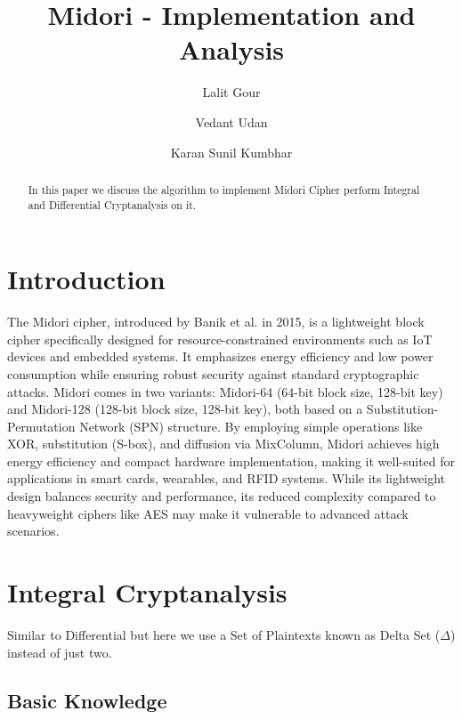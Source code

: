 \documentclass[journal=tosc,preprint]{iacrtrans}
\author{Lalit Gour\inst{1,2} \and Vedant Udan\inst{1,3} \and Karan Sunil Kumbhar\inst{1,4}}
\institute{
  \iitbhilai \and \email{lalitg@iitbhilai.ac.in} \and
  \email{udanvedant@iitbhilai.ac.in} \and
  \email{karansunilk@iitbhilai.ac.in} 
}
\title{Midori - Implementation and Analysis}
\begin{document}
\maketitle




\begin{abstract}
    In this paper we discuss the algorithm to implement Midori Cipher perform Integral and Differential Cryptanalysis on it.

\end{abstract}


\section{Introduction}

The Midori cipher, introduced by Banik et al. in 2015, is a lightweight block cipher specifically designed for resource-constrained environments such as IoT devices and embedded systems. It emphasizes energy efficiency and low power consumption while ensuring robust security against standard cryptographic attacks. Midori comes in two variants: Midori-64 (64-bit block size, 128-bit key) and Midori-128 (128-bit block size, 128-bit key), both based on a Substitution-Permutation Network (SPN) structure. By employing simple operations like XOR, substitution (S-box), and diffusion via MixColumn, Midori achieves high energy efficiency and compact hardware implementation, making it well-suited for applications in smart cards, wearables, and RFID systems. While its lightweight design balances security and performance, its reduced complexity compared to heavyweight ciphers like AES may make it vulnerable to advanced attack scenarios.

\section{Integral Cryptanalysis}
Similar to Differential but here we use a Set of Plaintexts known as Delta Set (\(\Delta\)) instead of just two.
\subsection{Basic Knowledge }
\end{document}
